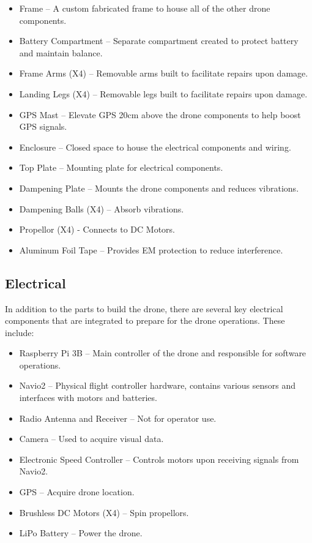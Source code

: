 \documentclass[12pt]{article}
\begin{document}
\begin{itemize}
    \item Frame – A custom fabricated frame to house all of the other drone components.
    \item Battery Compartment – Separate compartment created to protect battery and maintain balance.
    \item Frame Arms (X4) – Removable arms built to facilitate repairs upon damage.
    \item Landing Legs (X4) – Removable legs built to facilitate repairs upon damage.
    \item GPS Mast – Elevate GPS 20cm above the drone components to help boost GPS signals.
    \item Enclosure – Closed space to house the electrical components and wiring.
    \item Top Plate – Mounting plate for electrical components.
    \item Dampening Plate – Mounts the drone components and reduces vibrations.
    \item Dampening Balls (X4) – Absorb vibrations.
    \item Propellor (X4) - Connects to DC Motors.
    \item Aluminum Foil Tape – Provides EM protection to reduce interference.
\end{itemize}

\subsection{Electrical}

In addition to the parts to build the drone, there are several key electrical components that are integrated to prepare for the drone operations. These include:

\begin{itemize}
    \item Raspberry Pi 3B – Main controller of the drone and responsible for software operations.
    \item Navio2 – Physical flight controller hardware, contains various sensors and interfaces with motors and batteries.
    \item Radio Antenna and Receiver – Not for operator use.
    \item Camera – Used to acquire visual data.
    \item Electronic Speed Controller – Controls motors upon receiving signals from Navio2.
    \item GPS – Acquire drone location.
    \item Brushless DC Motors (X4) – Spin propellors.
    \item LiPo Battery – Power the drone.
\end{itemize}
\end{document}
